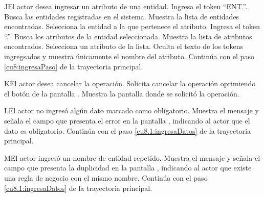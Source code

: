  \begin{UCtrayectoriaA}{J}{El actor desea ingresar un atributo de una entidad.}
 	\UCpaso[\UCactor] Ingresa el token ``ENT.''.
 	\UCpaso[\UCsist] Busca las entidades registradas en el sistema. 
 	\UCpaso[\UCsist] Muestra la lista de entidades encontradas.
 	\UCpaso[\UCactor] Selecciona la entidad a la que pertenece el atributo.
  	\UCpaso[\UCactor] Ingresa el token ``.''.
  	\UCpaso[\UCsist] Busca los atributos de la entidad seleccionada.
  	\UCpaso[\UCsist] Muestra la lista de atributos encontrados.
 	\UCpaso[\UCactor] Selecciona un atributo de la lista.
  	\UCpaso[\UCsist] Oculta el texto de los tokens ingregsados y muestra únicamente el nombre del atributo.
    \UCpaso[] Continúa con el paso \ref{cu8:ingresaPaso} de la trayectoria principal.
 \end{UCtrayectoriaA}
 \begin{UCtrayectoriaA}{K}{El actor desea cancelar la operación.}
    \UCpaso[\UCactor] Solicita cancelar la operación oprimiendo el botón  de la pantalla .
    \UCpaso[\UCsist] Muestra la pantalla donde se solicitó la operación.
 \end{UCtrayectoriaA}
 \begin{UCtrayectoriaA}{L}{El actor no ingresó algún dato marcado como obligatorio.}
    \UCpaso[\UCsist] Muestra el mensaje  y señala el campo que presenta el error en la pantalla 
	    , indicando al actor que el dato es obligatorio.
    \UCpaso[] Continúa con el paso \ref{cu8.1:ingresaDatos} de la trayectoria principal.
 \end{UCtrayectoriaA}
 \begin{UCtrayectoriaA}{M}{El actor ingresó un nombre de entidad repetido.}
    \UCpaso[\UCsist] Muestra el mensaje  y señala el campo que presenta la duplicidad en la pantalla 
	    , indicando al actor que existe una regla de negocio con el mismo nombre.
    \UCpaso[] Continúa con el paso \ref{cu8.1:ingresaDatos} de la trayectoria principal.
 \end{UCtrayectoriaA}
 

